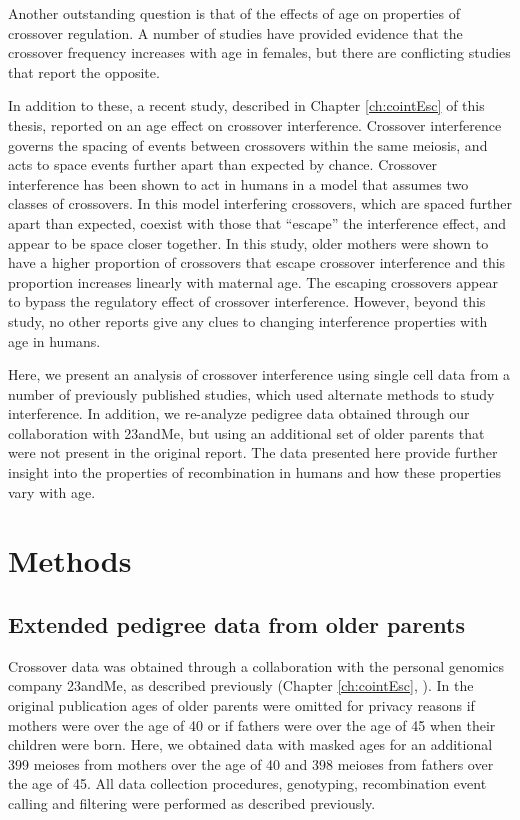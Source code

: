 Another outstanding question is that of the effects of age on properties of crossover regulation.
A number of studies have provided evidence that the crossover frequency increases with age in females\cite{Kong2004,Martin2015}, but there are conflicting studies that report the opposite\cite{Bleazard2013,Hussin2011}.

In addition to these, a recent study, described in Chapter \ref{ch:cointEsc} of this thesis, reported on an age effect on crossover interference.
Crossover interference governs the spacing of events between crossovers within the same meiosis, and acts to space events further apart than expected by chance.
Crossover interference has been shown to act in humans\cite{Broman2000,Housworth2003} in a model that assumes two classes of crossovers.
In this model interfering crossovers, which are spaced further apart than expected, coexist with those that ``escape'' the interference effect, and appear to be space closer together.
In this study, older mothers were shown to have a higher proportion of crossovers that escape crossover interference and this proportion increases linearly with maternal age\cite{Campbell2015}.
The escaping crossovers appear to bypass the regulatory effect of crossover interference.
However, beyond this study, no other reports give any clues to changing interference properties with age in humans.

Here, we present an analysis of crossover interference using single cell data from a number of previously published studies, which used alternate methods to study interference.
In addition, we re-analyze pedigree data obtained through our collaboration with 23andMe, but using an additional set of older parents that were not present in the original report.
The data presented here provide further insight into the properties of recombination in humans and how these properties vary with age.



\section{Methods}

\subsection{Extended pedigree data from older parents}
Crossover data was obtained through a collaboration with the personal genomics company 23andMe, as described previously (Chapter \ref{ch:cointEsc}, \citet{Campbell2015}).
In the original publication ages of older parents were omitted for privacy reasons if mothers were over the age of 40 or if fathers were over the age of 45 when their children were born.
Here, we obtained data with masked ages for an additional 399 meioses from mothers over the age of 40 and 398 meioses from fathers over the age of 45.
All data collection procedures, genotyping, recombination event calling and filtering were performed as described previously.

